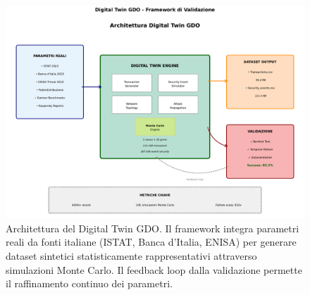 \begin{figure}[H]
\centering
\includegraphics[width=\textwidth]{thesis_figures/cap2/digital_twin_architecture.pdf}
\caption{Architettura del Digital Twin GDO. Il framework integra parametri 
reali da fonti italiane (ISTAT, Banca d'Italia, ENISA) per generare dataset 
sintetici statisticamente rappresentativi attraverso simulazioni Monte Carlo. 
Il feedback loop dalla validazione permette il raffinamento continuo dei parametri.}
\label{fig:digital_twin_architecture}
\end{figure}

